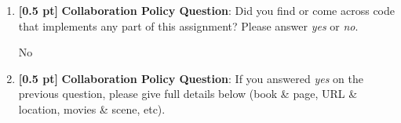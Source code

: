 \documentclass{article}
\begin{document}
\begin{enumerate}
    \item \textbf{[0.5 pt]} \textbf{Collaboration Policy Question}: Did you find or come across code that implements any part of this assignment? Please answer \textit{yes} or \textit{no}.
    \begin{tcolorbox}[width=\linewidth/3,height=1.5cm]
    No
    \end{tcolorbox}
    
    \item \textbf{[0.5 pt]} \textbf{Collaboration Policy Question}: If you answered \textit{yes} on the previous question, please give full details below (book \& page, URL \& location, movies \& scene, etc).
    \begin{tcolorbox}[height=1.5cm]
    \end{tcolorbox}
    
    
    
    
    
    
    
    
    
\end{enumerate}
\end{document}
